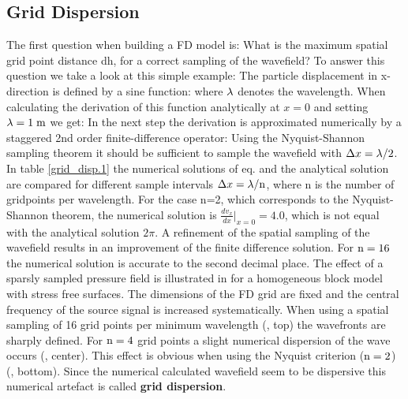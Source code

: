 \documentclass{hitec}
\begin{document}
\subsection{Grid Dispersion}\label{grid-dispersion}
The first question when building a FD model is: What is the maximum spatial grid point distance dh, for a correct sampling of the wavefield? To answer this question we take a look at this simple example: The particle displacement in x-direction is defined by a sine function:
where $\rm{\lambda}$ denotes the wavelength. When calculating the derivation of this function analytically at $x=0$ and setting $\rm{\lambda}=1\;\rm{m}$ we get:
In the next step the derivation is approximated numerically by a staggered 2nd order finite-difference operator:
Using the Nyquist-Shannon sampling theorem it should be sufficient to sample the wavefield with $\Delta x = \rm{\lambda}/2$. In table \ref{grid_disp.1} the
numerical solutions of eq.  and the analytical solution  are compared for different sample intervals 
$\Delta x = \rm{\lambda} /n$, where n is the number of gridpoints per wavelength. For the case n=2, which corresponds to the Nyquist-Shannon theorem, the
numerical solution is $\frac{d v_x}{d x}|_{x=0}=4.0$, which is not equal with the analytical solution $2 \pi$. A refinement of the spatial
sampling of the wavefield results in an improvement of the finite difference solution. For $\rm n=16$ the numerical solution is accurate to the second
decimal place. The effect of a sparsly sampled pressure field is illustrated in  for a homogeneous block model with stress free surfaces. The dimensions of the FD grid are fixed
and the central frequency of the source signal is increased systematically. 
When using a spatial sampling of 16 grid points per minimum wavelength (, top) the wavefronts are sharply defined. For $\rm n=4$ 
grid points a slight numerical dispersion of the wave occurs (, center). This effect is obvious when using the Nyquist criterion ($\rm n=2$) 
(, bottom). Since the numerical calculated wavefield seem to be dispersive this numerical artefact is called {\bf{grid dispersion}}. 
\end{document}
